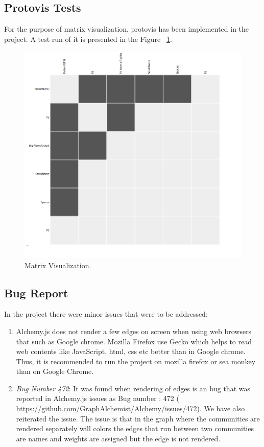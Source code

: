 \subsection{Protovis Tests}
For the purpose of matrix visualization, protovis has been implemented in the project. A test run of it is presented in the Figure ~\ref{test8}.
\begin{figure}[H]
\centering
\includegraphics[scale=0.3]{d4b.png}
\caption{\label{test8}Matrix Visualization.}
\end{figure}


\subsection{Bug Report}
In the project there were minor issues that were to be addressed:
\begin{enumerate}
\item  Alchemy.js does not render a few
edges on screen when using web browsers that such as Google chrome. Mozilla Firefox use Gecko
which helps to read web contents like JavaScript, html, css etc better than in Google chrome. Thus,
it is recommended to run the project on mozilla firefox or sea monkey than on Google Chrome.
\item \textit{Bug Number 472}: It was found when rendering of edges is an bug that was reported in Alchemy.js issues as Bug number : 472 ( \url{https://github.com/GraphAlchemist/Alchemy/issues/472}). We have also reiterated the issue. The issue is that in the graph where the communities are rendered separately will colors the edges that run between two communities are names and weights are assigned but the edge is not rendered.
\end{enumerate}

